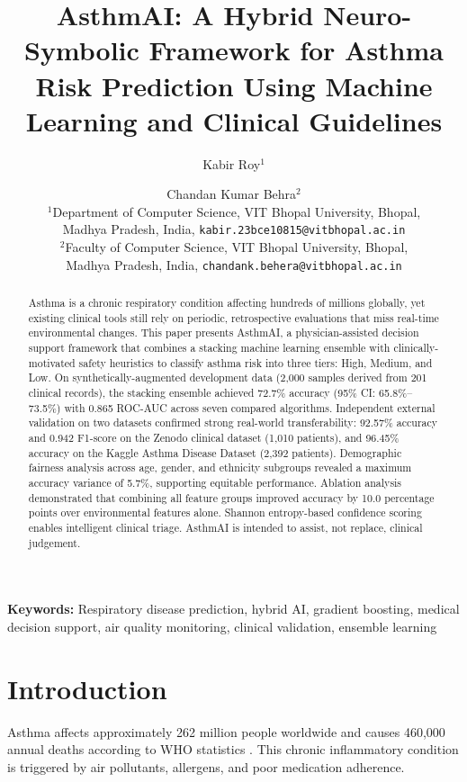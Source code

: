 \documentclass[11pt,a4paper]{article}
\title{\textbf{AsthmAI: A Hybrid Neuro-Symbolic Framework for Asthma Risk
Prediction Using Machine Learning and Clinical Guidelines}}
\author{
  Kabir Roy$^{1}$ \and Chandan Kumar Behra$^{2}$\\[6pt]
  \small $^{1}$Department of Computer Science, VIT Bhopal University, Bhopal,\\
  \small Madhya Pradesh, India, \texttt{kabir.23bce10815@vitbhopal.ac.in}\\[4pt]
  \small $^{2}$Faculty of Computer Science, VIT Bhopal University, Bhopal,\\
  \small Madhya Pradesh, India, \texttt{chandank.behera@vitbhopal.ac.in}
}
\date{}
\begin{document}
\maketitle
\vspace{-10pt}
\thispagestyle{fancy}

\begin{abstract}
Asthma is a chronic respiratory condition affecting hundreds of millions globally,
yet existing clinical tools still rely on periodic, retrospective evaluations that miss
real-time environmental changes. This paper presents AsthmAI, a physician-assisted
decision support framework that combines a stacking machine learning ensemble with
clinically-motivated safety heuristics to classify asthma risk into three tiers: High,
Medium, and Low. On synthetically-augmented development data (2,000 samples derived
from 201 clinical records), the stacking ensemble achieved 72.7\% accuracy (95\%
CI: 65.8\%--73.5\%) with 0.865 ROC-AUC across seven compared algorithms. Independent
external validation on two datasets confirmed strong real-world transferability:
92.57\% accuracy and 0.942 F1-score on the Zenodo clinical dataset (1,010 patients),
and 96.45\% accuracy on the Kaggle Asthma Disease Dataset (2,392 patients). Demographic
fairness analysis across age, gender, and ethnicity subgroups revealed a maximum
accuracy variance of 5.7\%, supporting equitable performance. Ablation analysis
demonstrated that combining all feature groups improved accuracy by 10.0 percentage
points over environmental features alone. Shannon entropy-based confidence scoring
enables intelligent clinical triage. AsthmAI is intended to assist, not replace,
clinical judgement.
\end{abstract}

\textbf{Keywords:} Respiratory disease prediction, hybrid AI, gradient boosting, medical
decision support, air quality monitoring, clinical validation, ensemble learning

\section{Introduction}

Asthma affects approximately 262 million people worldwide and causes 460,000 annual
deaths according to WHO statistics \cite{who2023}. This chronic inflammatory condition
is triggered by air pollutants, allergens, and poor medication adherence.
\end{document}
